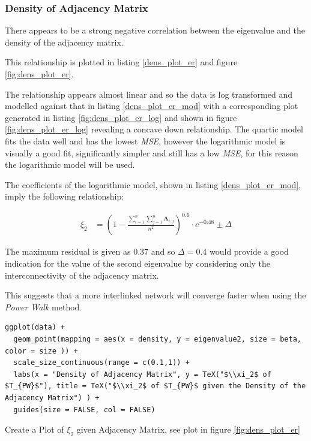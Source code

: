 \documentclass[11pt]{article}
\begin{document}
\subsubsection{Density of Adjacency Matrix}
\label{sec:org4e3effc}
There appears to be a strong negative correlation between the eigenvalue and the density of the adjacency matrix.

This relationship is plotted in listing \ref{dens_plot_er} and figure \ref{fig:dens_plot_er}.

The relationship appears almost linear and so the data is log transformed and
modelled against that in listing \ref{dens_plot_er_mod} with a corresponding plot
generated in listing \ref{fig:dens_plot_er_log} and shown in figure
\ref{fig:dens_plot_er_log} revealing a concave down relationship. The quartic model
fits the data well and has the lowest \emph{MSE}, however the logarithmic model is
visually a good fit, significantly simpler and still has a low \emph{MSE}, for this
reason the logarithmic model will be used.

The coefficients of the logarithmic model, shown in listing \ref{dens_plot_er_mod}, imply the following relationship:


\begin{align}
    \xi_2 &= \left( 1-  \frac{\sum^{n}_{i= 1} \sum^{n}_{j= 1}   \mathbf{A}_{i,j}  }{n^{2}} \right)^{0.6} \cdot  e^{- 0.48} \pm \Delta
\end{align}

The maximum residual is given as 0.37 and so \(\Delta = 0.4\) would provide a
good indication for the value of the second eigenvalue by considering only the
interconnectivity of the adjacency matrix.

This suggests that a more interlinked network will converge faster when using the \emph{Power Walk} method.


\begin{listing}[htbp]
\begin{verbatim}
ggplot(data) +
  geom_point(mapping = aes(x = density, y = eigenvalue2, size = beta, color = size )) +
  scale_size_continuous(range = c(0.1,1)) +
  labs(x = "Density of Adjacency Matrix", y = TeX("$\\xi_2$ of $T_{PW}$"), title = TeX("$\\xi_2$ of $T_{PW}$ given the Density of the Adjacency Matrix") ) +
  guides(size = FALSE, col = FALSE)

\end{verbatim}
\caption{\label{dens_plot_er}Create a Plot of \(\xi_{2}\) given Adjacency Matrix, see plot in figure \ref{fig:dens_plot_er}}
\end{listing}
\end{document}

